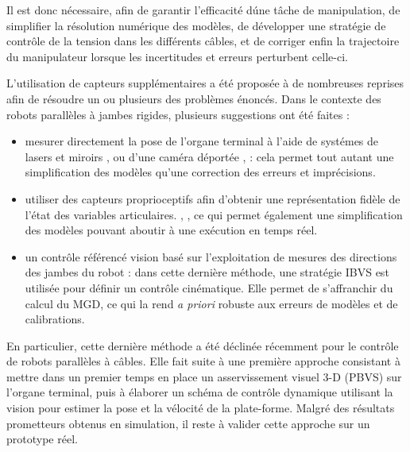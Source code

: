 Il est donc n\'ecessaire, afin de garantir l'efficacit\'e d\'une t\^ache de
manipulation, de simplifier la r\'esolution num\'erique des mod\`eles, de
d\'evelopper une strat\'egie de contr\^ole de la tension dans les diff\'erents
c\^ables, et de corriger enfin la trajectoire du manipulateur lorsque les
incertitudes et erreurs perturbent celle-ci.

L'utilisation de capteurs suppl\'ementaires a \'et\'e propos\'ee \`a de
nombreuses reprises afin de r\'esoudre un ou plusieurs des probl\`emes
\'enonc\'es. Dans le contexte des robots parall\`eles \`a jambes rigides,
plusieurs suggestions ont \'et\'e faites :
\begin{itemize}
 \item mesurer directement la pose de l'organe terminal \`a l'aide de
syst\'emes de lasers et miroirs \cite{marantette1995machine}, \cite{Heeren:1992}
ou d'une cam\'era d\'eport\'ee \cite{dallej.2006}, \cite{paccot.2008} : cela
permet tout autant une simplification des mod\`eles qu'une correction des
erreurs et impr\'ecisions.
\item utiliser des capteurs proprioceptifs afin d'obtenir une repr\'esentation
fid\`ele de l'\'etat des variables articulaires.
\cite{merlet.1993}, \cite{parenti.2000}, ce qui permet \'egalement une
simplification des mod\`eles pouvant aboutir \`a une ex\'ecution en temps
r\'eel. 
\item un contr\^ole r\'ef\'erenc\'e vision bas\'e sur l'exploitation de mesures
des directions des jambes du robot \cite{andreff2007} : dans cette derni\`ere
m\'ethode, une strat\'egie IBVS est utilis\'ee pour d\'efinir un contr\^ole
cin\'ematique. Elle permet de s'affranchir du calcul du MGD, ce qui la rend
{\it a priori} robuste aux erreurs de mod\`eles et de calibrations.
\end{itemize}

En particulier, cette derni\`ere m\'ethode a \'et\'e d\'eclin\'ee r\'ecemment
pour le contr\^ole de robots parall\`eles \`a c\^ables. Elle fait suite \`a
une premi\`ere approche \cite{conf/iros/DallejGAMM11} consistant \`a mettre dans
un premier temps en place un asservissement visuel 3-D (PBVS) sur l'organe
terminal, puis \`a \'elaborer un sch\'ema de contr\^ole dynamique utilisant la
vision pour estimer la pose et la v\'elocit\'e de la plate-forme. Malgr\'e des
r\'esultats prometteurs obtenus en simulation, il reste \`a valider cette
approche sur un prototype r\'eel.

